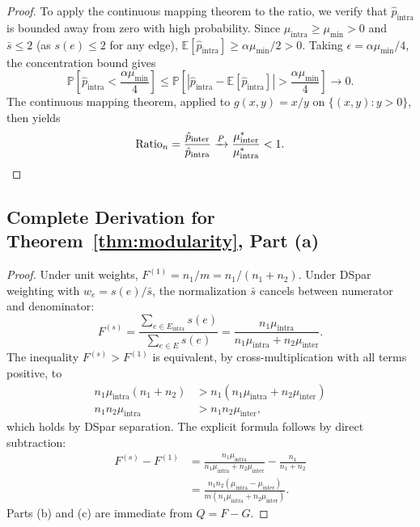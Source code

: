\documentclass[10pt,journal,compsoc]{IEEEtran}
\begin{document}
\begin{proof}
To apply the continuous mapping theorem to the ratio, we verify that $\hat{p}_{\text{intra}}$ is bounded away from zero with high probability.
Since $\mu_{\text{intra}} \geq \mu_{\min} > 0$ and $\bar{s} \leq 2$ (as $s(e) \leq 2$ for any edge), $\mathbb{E}[\hat{p}_{\text{intra}}] \geq \alpha \mu_{\min}/2 > 0$.
Taking $\epsilon = \alpha \mu_{\min}/4$, the concentration bound gives
\begin{equation}
\mathbb{P}\left[\hat{p}_{\text{intra}} < \frac{\alpha \mu_{\min}}{4}\right] \leq \mathbb{P}\left[|\hat{p}_{\text{intra}} - \mathbb{E}[\hat{p}_{\text{intra}}]| > \frac{\alpha \mu_{\min}}{4}\right] \to 0.
\end{equation}
The continuous mapping theorem, applied to $g(x,y) = x/y$ on $\{(x,y) : y > 0\}$, then yields
\begin{equation}
\text{Ratio}_n = \frac{\hat{p}_{\text{inter}}}{\hat{p}_{\text{intra}}} \xrightarrow{P} \frac{\mu_{\text{inter}}^*}{\mu_{\text{intra}}^*} < 1. \qedhere
\end{equation}
\end{proof}

\subsection*{Complete Derivation for Theorem~\ref{thm:modularity}, Part (a)}

\begin{proof}
Under unit weights, $F^{(1)} = n_1/m = n_1/(n_1 + n_2)$.
Under DSpar weighting with $w_e = s(e)/\bar{s}$, the normalization $\bar{s}$ cancels between numerator and denominator:
\begin{equation}
F^{(s)} = \frac{\sum_{e \in E_{\text{intra}}} s(e)}{\sum_{e \in E} s(e)} = \frac{n_1 \mu_{\text{intra}}}{n_1 \mu_{\text{intra}} + n_2 \mu_{\text{inter}}}.
\end{equation}
The inequality $F^{(s)} > F^{(1)}$ is equivalent, by cross-multiplication with all terms positive, to
\begin{align}
n_1 \mu_{\text{intra}} (n_1 + n_2) &> n_1 (n_1 \mu_{\text{intra}} + n_2 \mu_{\text{inter}}) \\
n_1 n_2 \mu_{\text{intra}} &> n_1 n_2 \mu_{\text{inter}},
\end{align}
which holds by DSpar separation.
The explicit formula follows by direct subtraction:
\begin{align}
F^{(s)} - F^{(1)} &= \frac{n_1 \mu_{\text{intra}}}{n_1 \mu_{\text{intra}} + n_2 \mu_{\text{inter}}} - \frac{n_1}{n_1 + n_2} \\
&= \frac{n_1 n_2 (\mu_{\text{intra}} - \mu_{\text{inter}})}{m(n_1 \mu_{\text{intra}} + n_2 \mu_{\text{inter}})}.
\end{align}
Parts (b) and (c) are immediate from $Q = F - G$.
\end{proof}
\end{document}
